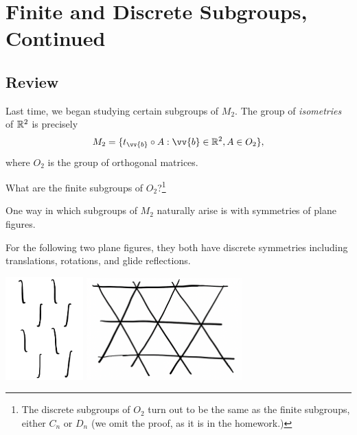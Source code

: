 
\section{Finite and Discrete Subgroups, Continued}

\subsection{Review}
Last time, we began studying certain subgroups of $M_2.$ The group of \emph{isometries} of $\mathbb R^2$ is precisely
\[
M_2 = \{t_{\vv{b}} \circ A : \vv{b} \in \RR^2, A \in O_2\},
\]
where $O_2$ is the group of orthogonal matrices. 

\begin{qq}
What are the finite subgroups of $O_2$?\footnote{The discrete subgroups of $O_2$ turn out to be the same as the finite subgroups, either $C_n$ or $D_n$ (we omit the proof, as it is in the homework.)} 
\end{qq}
One way in which subgroups of $M_2$ naturally arise is with symmetries of plane figures. 
\begin{example}
For the following two plane figures, they both have discrete symmetries including translations, rotations, and glide reflections. 
\begin{center}
    \includegraphics[width=3cm]{Lecture Files and Images/lec15-1integrals.png} \includegraphics[width=6cm]{Lecture Files and Images/lec15-2trianglegrid.png}
\end{center}
\end{example}

